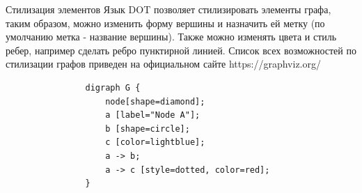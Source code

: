 \documentclass{beamer}
\begin{document}
\begin{frame}[fragile]{Стилизация элементов}
	Язык DOT позволяет стилизировать элементы графа, таким образом, можно изменить форму вершины и назначить ей метку (по умолчанию метка - название вершины). Также можно изменять цвета и стиль ребер, например сделать ребро пунктирной линией. Список всех возможностей по стилизации графов приведен на официальном сайте https://graphviz.org/
	\newline
	\newline
	\begin{minipage}{0.5\textwidth}
		\begin{verbatim}
				digraph G {
					node[shape=diamond];
					a [label="Node A"];
					b [shape=circle];
					c [color=lightblue];
					a -> b;
					a -> c [style=dotted, color=red];
				}
		\end{verbatim}
	\end{minipage}
	\hfill
	\begin{minipage}{0.45\textwidth}
	\end{minipage}
\end{frame}             
\end{document}
